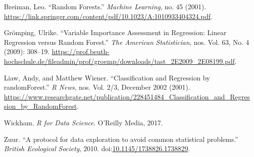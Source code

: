 \documentclass[a4paper, nobind]{templates/ociamthesis}
\newcommand*{\bibtitle}{Works Cited}
\begin{document}
\hypertarget{refs}{}
\leavevmode\hypertarget{ref-Breiman2001}{}%
Breiman, Leo. ``Random Forests.'' \emph{Machine Learning}, no. 45 (2001). \url{https://link.springer.com/content/pdf/10.1023/A:1010933404324.pdf}.

\leavevmode\hypertarget{ref-Groemping2009}{}%
Grömping, Ulrike. ``Variable Importance Assessment in Regression: Linear Regression versus Random Forest.'' \emph{The American Statistician}, nos. Vol. 63, No. 4 (2009): 308--19. \url{https://prof.beuth-hochschule.de/fileadmin/prof/groemp/downloads/tast_2E2009_2E08199.pdf}.

\leavevmode\hypertarget{ref-Liaw2002}{}%
Liaw, Andy, and Matthew Wiener. ``Classification and Regression by randomForest.'' \emph{R News}, nos. Vol. 2/3, December 2002 (2001). \url{https://www.researchgate.net/publication/228451484_Classification_and_Regression_by_RandomForest}.

\leavevmode\hypertarget{ref-Hadley2017}{}%
Wickham. \emph{R for Data Science}. O'Reilly Media, 2017.

\leavevmode\hypertarget{ref-Zuur2010}{}%
Zuur. ``A protocol for data exploration to avoid common statistical problems.'' \emph{British Ecological Society}, 2010. doi:\href{https://doi.org/10.1145/1738826.1738829}{10.1145/1738826.1738829}.




\setlength{\baselineskip}{0pt} %

{\renewcommand*\MakeUppercase[1]{#1}%
\printbibliography[heading=bibintoc,title={\bibtitle}]}
\end{document}
